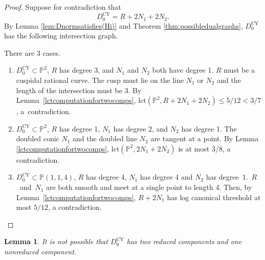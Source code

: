\documentclass[JEP,XML,SOM,Unicode,NoFloatCountersInSection,published]{cedram}
\theoremstyle{plain}
\newtheorem{lemma}[theorem]{Lemma}
\theoremstyle{definition}
\newcommand\PP{{\mathbb{P}}}
\newcommand\lct{\mathrm{lct}}
\newcommand\Dcyo{{D^{\mathrm{CY}}_0}}
\begin{document}
\begin{proof}
Suppose for contradiction that
\[
\Dcyo = R+2N_1+2N_2.
\]
By Lemma \ref{lem:Dnormsatisfies(Hi)} and Theorem \ref{thm:possibledualgraphs}, $\Dcyo$ has the following intersection graph.

\begin{figure}[htb]
\centering
\scalebox{1.3}{}
\end{figure}

\noindent There are 3 cases.
\begin{enumerate}
\item$\Dcyo\subset \PP^2$, $R$ has degree 3, and $N_1$ and $N_2$ both have degree 1. $R$ must be a cuspidal rational curve. The cusp must lie on the line $N_1$ or $N_2$ and the length of the intersection must be 3. By Lemma~\ref{lctcomputationfortwocomps}, $\lct(\PP^2, R+2N_1+2N_2)\le 5/12<3/7$, a~contradiction.
\item $\Dcyo\subset \PP^2$, $R$ has degree 1, $N_1$ has degree 2, and $N_2$ has degree 1. The doubled conic $N_1$ and the doubled line $N_2$ are tangent at a point. By Lemma \ref{lctcomputationfortwocomps}, $\lct(\PP^2,2N_1+2N_2)$ is at most $3/8$, a contradiction.
\item $\Dcyo \!\subset\! \PP(1,1,4)$, $R$ has degree 4, $N_1$ has degree 4 and $N_2$ has \hbox{degree}~1.~$R$~and~$N_1$ are both smooth and meet at a single point to length 4. Then, by Lemma~\ref{lctcomputationfortwocomps}, $R+2N_1$ has log canonical threshold at most $5/12$, a contradiction. \qedhere
\end{enumerate}
\end{proof}

\begin{lemma}\label{onenoneredtwored}
It is not possible that $\Dcyo$ has two reduced components and one nonreduced component.
\end{lemma}
\end{document}
